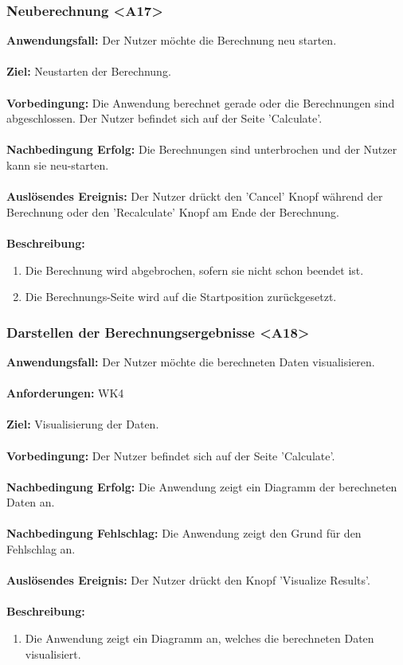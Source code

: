 \documentclass[parskip=full]{scrartcl} %
\begin{document}
\subsubsection*{Neuberechnung <A17>}
\textbf{Anwendungsfall:}  Der Nutzer möchte die Berechnung neu starten.\\\\
\textbf{Ziel:} Neustarten der Berechnung.\\\\
\textbf{Vorbedingung:} Die Anwendung berechnet gerade oder die Berechnungen sind abgeschlossen. Der Nutzer befindet sich auf der Seite 'Calculate'.\\\\
\textbf{Nachbedingung Erfolg:} Die Berechnungen sind unterbrochen und der Nutzer kann sie neu-starten.\\\\
\textbf{Auslösendes Ereignis:} Der Nutzer drückt den 'Cancel' Knopf während der Berechnung oder den 'Recalculate' Knopf am Ende der Berechnung.\\\\
\textbf{Beschreibung:}
\begin{enumerate}
    \item Die Berechnung wird abgebrochen, sofern sie nicht schon beendet ist.
    \item Die Berechnungs-Seite wird auf die Startposition zurückgesetzt.
\end{enumerate}
\newpage



\subsubsection*{Darstellen der Berechnungsergebnisse <A18>}
\textbf{Anwendungsfall:} Der Nutzer möchte die berechneten Daten visualisieren.\\\\
\textbf{Anforderungen:} WK4\\\\
\textbf{Ziel:} Visualisierung der Daten.\\\\
\textbf{Vorbedingung:}  Der Nutzer befindet sich auf der Seite 'Calculate'.\\\\
\textbf{Nachbedingung Erfolg:} Die Anwendung zeigt ein Diagramm der berechneten Daten an.\\\\
\textbf{Nachbedingung Fehlschlag:} Die Anwendung zeigt den Grund für den Fehlschlag an.\\\\
\textbf{Auslösendes Ereignis:} Der Nutzer drückt den Knopf 'Visualize Results'.\\\\
\textbf{Beschreibung:}
\begin{enumerate}
    \item Die Anwendung zeigt ein Diagramm an, welches die berechneten Daten visualisiert.
\end{enumerate}
\newpage
\end{document}
